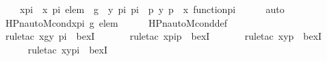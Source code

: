 \begin{isabellebody}
\ \ \ \ {\isachardoublequoteopen}x{\isacharunderscore}{\kern0pt}pi\ {\isacharequal}{\kern0pt}\ {\isacharless}{\kern0pt}x{\isacharcomma}{\kern0pt}\ pi{\isachargreater}{\kern0pt}{\isachardoublequoteclose}\ {\isachardoublequoteopen}elem\ {\isacharequal}{\kern0pt}\ {\isasymlangle}g\ {\isacharbackquote}{\kern0pt}\ {\isasymlangle}y{\isacharcomma}{\kern0pt}\ pi{\isasymrangle}{\isacharcomma}{\kern0pt}\ pi\ {\isacharbackquote}{\kern0pt}\ p{\isasymrangle}{\isachardoublequoteclose}\ {\isachardoublequoteopen}{\isasymlangle}y{\isacharcomma}{\kern0pt}\ p{\isasymrangle}\ {\isasymin}\ x{\isachardoublequoteclose}\ {\isachardoublequoteopen}function{\isacharparenleft}{\kern0pt}pi{\isacharparenright}{\kern0pt}{\isachardoublequoteclose}\isanewline
\ \ \ \ \isamarkupfalse%
\ auto\ \isanewline
\isanewline
\ \ \isamarkupfalse%
\ {\isachardoublequoteopen}HPn{\isacharunderscore}{\kern0pt}auto{\isacharunderscore}{\kern0pt}M{\isacharunderscore}{\kern0pt}cond{\isacharparenleft}{\kern0pt}x{\isacharunderscore}{\kern0pt}pi{\isacharcomma}{\kern0pt}\ g{\isacharcomma}{\kern0pt}\ elem{\isacharparenright}{\kern0pt}{\isachardoublequoteclose}\isanewline
\ \ \ \ \isamarkupfalse%
\ HPn{\isacharunderscore}{\kern0pt}auto{\isacharunderscore}{\kern0pt}M{\isacharunderscore}{\kern0pt}cond{\isacharunderscore}{\kern0pt}def\ \isanewline
\ \ \ \ \isamarkupfalse%
\ {\isacharparenleft}{\kern0pt}rule{\isacharunderscore}{\kern0pt}tac\ x{\isacharequal}{\kern0pt}{\isachardoublequoteopen}g{\isacharbackquote}{\kern0pt}{\isacharless}{\kern0pt}y{\isacharcomma}{\kern0pt}\ pi{\isachargreater}{\kern0pt}{\isachardoublequoteclose}\ \ bexI{\isacharparenright}{\kern0pt}\ \isanewline
\ \ \ \ \isamarkupfalse%
\ {\isacharparenleft}{\kern0pt}rule{\isacharunderscore}{\kern0pt}tac\ x{\isacharequal}{\kern0pt}{\isachardoublequoteopen}pi{\isacharbackquote}{\kern0pt}p{\isachardoublequoteclose}\ \ bexI{\isacharparenright}{\kern0pt}\ \isanewline
\ \ \ \ \isamarkupfalse%
\ {\isacharparenleft}{\kern0pt}rule{\isacharunderscore}{\kern0pt}tac\ x{\isacharequal}{\kern0pt}{\isachardoublequoteopen}{\isacharless}{\kern0pt}y{\isacharcomma}{\kern0pt}p{\isachargreater}{\kern0pt}{\isachardoublequoteclose}\ \ bexI{\isacharparenright}{\kern0pt}\ \isanewline
\ \ \ \ \isamarkupfalse%
\ {\isacharparenleft}{\kern0pt}rule{\isacharunderscore}{\kern0pt}tac\ x{\isacharequal}{\kern0pt}{\isachardoublequoteopen}{\isacharless}{\kern0pt}y{\isacharcomma}{\kern0pt}pi{\isachargreater}{\kern0pt}{\isachardoublequoteclose}\ \ bexI{\isacharparenright}{\kern0pt}\ \isanewline

\end{isabellebody}
